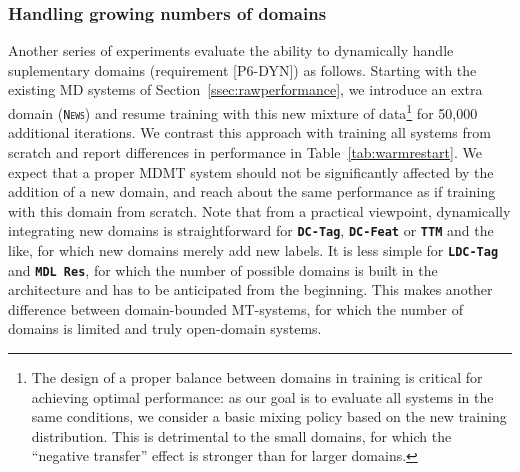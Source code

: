 \documentclass[11pt,a4paper]{article}
\newcommand{\fyDone}[1]{\done[FY]\Todo[FY:]{\textcolor{orange}{#1}}}
\newcommand{\domain}[1]{\texttt{\textsc{#1}}}
\newcommand{\system}[1]{\texttt{\textbf{#1}}}
\begin{document}
\subsubsection{Handling growing numbers of domains}
Another series of experiments evaluate the ability to dynamically handle suplementary domains (requirement [P6-DYN]) as follows. Starting with the existing MD systems of Section~\ref{ssec:rawperformance}, we introduce an extra domain (\domain{News}) and resume training with this new mixture of data\footnote{The design of a proper balance between domains in training is critical for achieving optimal performance: as our goal is to evaluate all systems in the same conditions, we consider a basic mixing policy based on the new training distribution. This is detrimental to the small domains, for which the ``negative transfer'' effect is stronger than for larger domains.} for 50,000 additional iterations.\fyDone{Training regime of continuation} We contrast this approach with training all systems from scratch and report differences in performance in Table~\ref{tab:warmrestart}.
We expect that a proper MDMT system should not be significantly affected by the addition of a new domain, and reach about the same performance as if training with this domain from scratch. Note that from a practical viewpoint, dynamically integrating new domains is straightforward for \system{DC-Tag}, \system{DC-Feat} or \system{TTM} and the like, for which new domains merely add new labels. It is less simple for \system{LDC-Tag} and \system{MDL~Res}\fyDone{Complete effects of new domain}, for which the number of possible domains is built in the architecture and has to be anticipated from the beginning. This makes another difference between domain-bounded MT-systems, for which the number of domains is limited and truly open-domain systems.%
\end{document}
